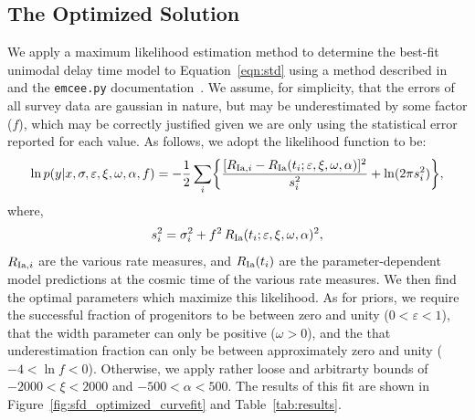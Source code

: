 \documentclass[apj]{aastex62}
\begin{document}
\subsection{The Optimized Solution\label{sec:optimized_soln}}
We apply a maximum likelihood estimation method to determine the best-fit unimodal delay time model to Equation~\ref{eqn:std} using a method described in \cite{Hogg:2010fj} and the {\tt emcee.py} documentation~\citep{Foreman-Mackey:2013pd}. We assume, for simplicity, that the errors of all survey data are gaussian in nature, but may be underestimated by some factor ($f$), which may be correctly justified given we are only using the statistical error reported for each value.  As follows, we adopt the likelihood function to be:
\begin{equation}
\ln p(y|x, \sigma, \varepsilon, \xi, \omega, \alpha, f) = -\frac{1}{2} \sum_i \biggl\{ \frac{[R_{{\rm Ia},i} - R_{\rm Ia}(t_i; \varepsilon, \xi, \omega, \alpha)]^2}{s_i^2}+\ln (2\pi s_i^2)\biggr\},
	\label{eqn:lf}
\end{equation}
where,
\begin{equation}
s_i^2 = \sigma_i^2+f^2\, R_{\rm Ia}(t_i; \varepsilon, \xi, \omega, \alpha)^2,
\end{equation}
\noindent $R_{{\rm Ia},i}$ are the various rate measures, and $R_{\rm Ia}(t_i)$ are the parameter-dependent model predictions at the cosmic time of the various rate measures. We then find the optimal parameters which maximize this likelihood. As for priors, we require the successful fraction of progenitors to be between zero and unity ($0<\varepsilon<1$), that the width parameter can only be positive ($\omega>0$), and the that underestimation fraction can only be between approximately zero and unity ($-4<\ln f<0$). Otherwise, we apply rather loose and arbitrarty bounds of $-2000<\xi<2000$ and  $-500 < \alpha < 500$. The results of this fit are shown in Figure~\ref{fig:sfd_optimized_curvefit} and Table~\ref{tab:results}. 
\end{document}
